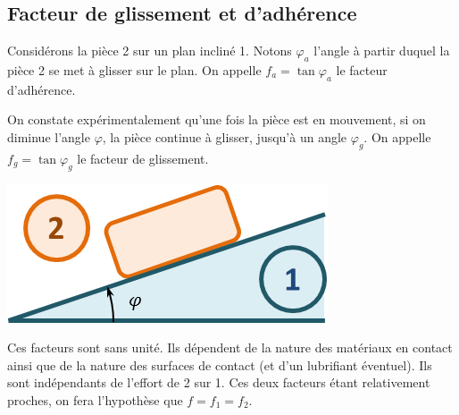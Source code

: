 \documentclass[10pt,fleqn]{article} %
\begin{document}
\subsection{Facteur de glissement et d'adhérence}
\noindent\begin{minipage}[c]{.7\linewidth}
Considérons la pièce 2 sur un plan incliné 1. Notons $\varphi_a$ l'angle à partir duquel la pièce 2 se met à glisser sur le plan. On appelle  $f_a=\tan\varphi_a$ le facteur d'adhérence.

On constate expérimentalement qu'une fois la pièce est en mouvement, si on diminue l'angle $\varphi$, la pièce continue à glisser, jusqu'à un angle  $\varphi_g$. On appelle \textbf{$f_g=\tan\varphi_g$} le facteur de glissement.
\end{minipage}\hfill
\begin{minipage}[c]{.25\linewidth}
\begin{center}
\includegraphics[width=\linewidth]{images/fig_02}
\end{center}
\end{minipage}

Ces facteurs sont sans unité. Ils dépendent de la nature des matériaux en contact ainsi que de la nature des surfaces de contact (et d'un lubrifiant éventuel). Ils sont indépendants de l'effort de 2 sur 1. Ces deux facteurs étant relativement proches, on fera l'hypothèse que $f=f_1=f_2$. 
\end{document}
